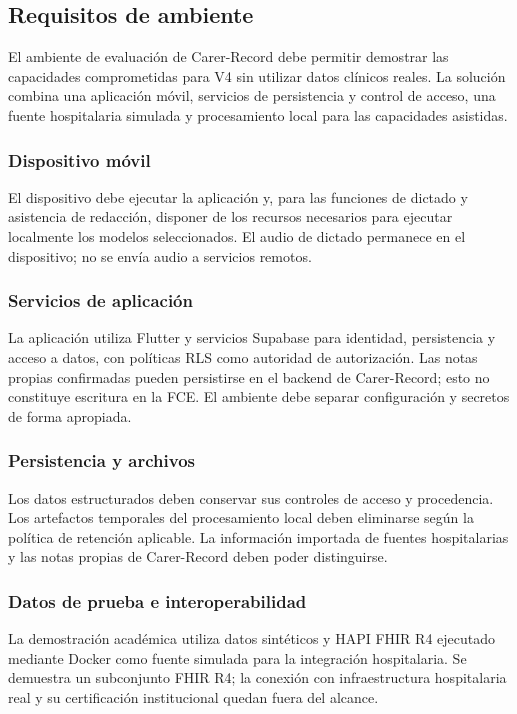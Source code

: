 \subsection{Requisitos de ambiente}

El ambiente de evaluación de Carer-Record debe permitir demostrar las capacidades comprometidas para V4 sin utilizar datos clínicos reales. La solución combina una aplicación móvil, servicios de persistencia y control de acceso, una fuente hospitalaria simulada y procesamiento local para las capacidades asistidas.

\subsubsection{Dispositivo móvil}

El dispositivo debe ejecutar la aplicación y, para las funciones de dictado y asistencia de redacción, disponer de los recursos necesarios para ejecutar localmente los modelos seleccionados. El audio de dictado permanece en el dispositivo; no se envía audio a servicios remotos.

\subsubsection{Servicios de aplicación}

La aplicación utiliza Flutter y servicios Supabase para identidad, persistencia y acceso a datos, con políticas RLS como autoridad de autorización. Las notas propias confirmadas pueden persistirse en el backend de Carer-Record; esto no constituye escritura en la FCE. El ambiente debe separar configuración y secretos de forma apropiada.

\subsubsection{Persistencia y archivos}

Los datos estructurados deben conservar sus controles de acceso y procedencia. Los artefactos temporales del procesamiento local deben eliminarse según la política de retención aplicable. La información importada de fuentes hospitalarias y las notas propias de Carer-Record deben poder distinguirse.

\subsubsection{Datos de prueba e interoperabilidad}

La demostración académica utiliza datos sintéticos y HAPI FHIR R4 ejecutado mediante Docker como fuente simulada para la integración hospitalaria. Se demuestra un subconjunto FHIR R4; la conexión con infraestructura hospitalaria real y su certificación institucional quedan fuera del alcance.
